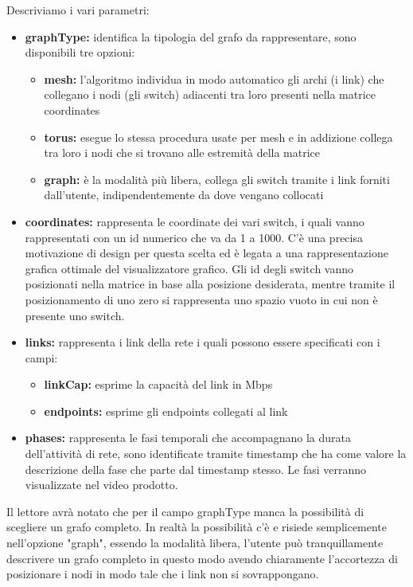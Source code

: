\documentclass[binding=0.6cm]{sapthesis}
\begin{document}
Descriviamo i vari parametri:
\begin{itemize}
    \item \textbf{graphType:} identifica la tipologia del grafo da rappresentare, sono disponibili tre opzioni:
    \begin{itemize}
        \item \textbf{mesh:} l'algoritmo individua in modo automatico gli archi (i link) che collegano i nodi (gli switch) adiacenti tra loro presenti nella matrice coordinates
        \item \textbf{torus:} esegue lo stessa procedura usate per mesh e in addizione collega tra loro i nodi che si trovano alle estremità della matrice
        \item \textbf{graph:} è la modalità più libera, collega gli switch tramite i link forniti dall'utente, indipendentemente da dove vengano collocati
    \end{itemize}
    \item \textbf{coordinates:} rappresenta le coordinate dei vari switch, 
    i quali vanno rappresentati con un id numerico che va da 1 a 1000. 
    C'è una precisa motivazione di design per questa scelta ed è legata a una rappresentazione 
    grafica ottimale del visualizzatore grafico.
    Gli id degli switch vanno posizionati nella matrice in base alla posizione desiderata, mentre tramite il posizionamento di uno zero si rappresenta uno spazio vuoto in cui non è presente uno switch.
    \item \textbf{links:} rappresenta i link della rete i quali possono essere specificati con i campi:
    \begin{itemize}
        \item \textbf{linkCap:} esprime la capacità del link in Mbps
        \item \textbf{endpoints:} esprime gli endpoints collegati al link
    \end{itemize}
    \item \textbf{phases:} rappresenta le fasi temporali che accompagnano la durata dell'attività di rete, sono identificate tramite timestamp che ha come valore la descrizione della fase che parte dal timestamp stesso. Le fasi verranno visualizzate nel video prodotto.
\end{itemize}
Il lettore avrà notato che per il campo graphType manca la possibilità di scegliere un grafo completo. In realtà la possibilità c'è e risiede semplicemente
nell'opzione "graph", essendo la modalità libera, l'utente può tranquillamente descrivere un grafo completo in questo modo avendo chiaramente l'accortezza di posizionare i nodi in modo tale che i link non si sovrappongano.
\end{document}
